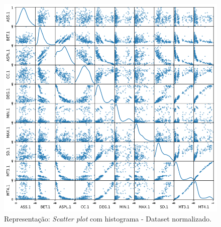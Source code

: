 \documentclass[
	article,			%
	11pt,				%
	oneside,			%
	a4paper,			%
	english,			%
	brazil,				%
	sumario=tradicional
	]{abntex2}
\begin{document}
\newpage
\begin{figure}[H]
 \centering
 \includegraphics[scale=0.5]{fig/scatter_kde02.png}
 \caption{Representação: \textit{Scatter plot} com histograma - Dataset normalizado.}
 \label{fig:scatter_kde02}
\end{figure}
\end{document}
